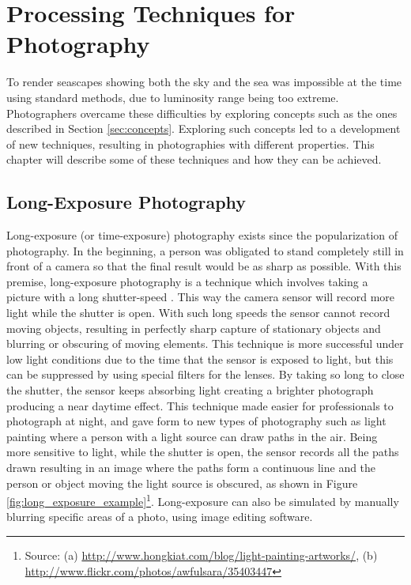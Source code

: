 \section{Processing Techniques for Photography}
\label{sub:photo_techniques}

To render seascapes showing both the sky and the sea was impossible at the time using standard methods, due to luminosity range being too extreme. Photographers overcame these difficulties by exploring concepts such as the ones described in Section \ref{sec:concepts}. Exploring such concepts led to a development of new techniques, resulting in photographies with different properties. This chapter will describe some of these techniques and how they can be achieved.

\subsection{Long-Exposure Photography}

Long-exposure (or time-exposure) photography exists since the popularization of photography. In the beginning, a person was obligated to stand completely still in front of a camera so that the final result would be as sharp as possible.
With this premise, long-exposure photography is a technique which involves taking a picture with a long shutter-speed \cite{kamps2012rules}. This way the camera sensor will record more light while the shutter is open. With such long speeds the sensor cannot record moving objects, resulting in perfectly sharp capture of stationary objects and blurring or obscuring of moving elements.
This technique is more successful under low light conditions due to the time that the sensor is exposed to light, but this can be suppressed by using special filters for the lenses. By taking so long to close the shutter, the sensor keeps absorbing light creating a brighter photograph producing a near daytime effect.
This technique made easier for professionals to photograph at night, and gave form to new types of photography such as light painting where a person with a light source can draw paths in the air. Being more sensitive to light, while the shutter is open, the sensor records all the paths drawn resulting in an image where the paths form a continuous line and the person or object moving the light source is obscured, as shown in Figure \ref{fig:long_exposure_example}\footnote{Source: (a) \url{http://www.hongkiat.com/blog/light-painting-artworks/}, (b) \url{http://www.flickr.com/photos/awfulsara/35403447}}. Long-exposure can also be simulated by manually blurring specific areas of a photo, using image editing software.

